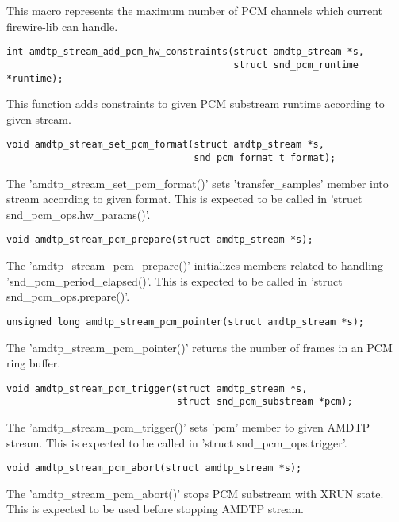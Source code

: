 \documentclass[onecolumn]{article}
\begin{document}
This macro represents the maximum number of PCM channels which current firewire-lib can handle.

\begin{verbatim}
int amdtp_stream_add_pcm_hw_constraints(struct amdtp_stream *s,
                                        struct snd_pcm_runtime *runtime);
\end{verbatim}

This function adds constraints to given PCM substream runtime according to given stream.

\begin{verbatim}
void amdtp_stream_set_pcm_format(struct amdtp_stream *s,
                                 snd_pcm_format_t format);
\end{verbatim}

The 'amdtp\_stream\_set\_pcm\_format()' sets 'transfer\_samples' member into stream according to given format. This is expected to be called in 'struct snd\_pcm\_ops.hw\_params()'.

\begin{verbatim}
void amdtp_stream_pcm_prepare(struct amdtp_stream *s);
\end{verbatim}

The 'amdtp\_stream\_pcm\_prepare()' initializes members related to handling 'snd\_pcm\_period\_elapsed()'. This is expected to be called in 'struct snd\_pcm\_ops.prepare()'.

\begin{verbatim}
unsigned long amdtp_stream_pcm_pointer(struct amdtp_stream *s);
\end{verbatim}

The 'amdtp\_stream\_pcm\_pointer()' returns the number of frames in an PCM ring buffer.

\begin{verbatim}
void amdtp_stream_pcm_trigger(struct amdtp_stream *s,
                              struct snd_pcm_substream *pcm);
\end{verbatim}

The 'amdtp\_stream\_pcm\_trigger()' sets 'pcm' member to given AMDTP stream. This is expected to be called in 'struct snd\_pcm\_ops.trigger'.

\begin{verbatim}
void amdtp_stream_pcm_abort(struct amdtp_stream *s);
\end{verbatim}

The 'amdtp\_stream\_pcm\_abort()' stops PCM substream with XRUN state. This is expected to be used before stopping AMDTP stream.
\end{document}
